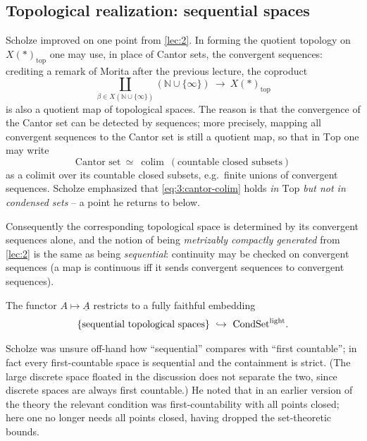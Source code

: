 \subsection{Topological realization: sequential spaces}

Scholze improved on one point from \cref{lec:2}. In forming the quotient
topology on $X(*)_{\mathrm{top}}$ one may use, in place of Cantor sets, the
convergent sequences: crediting a remark of Morita after the previous lecture,
the coproduct
\begin{equation*}
\coprod_{\beta\in X(\mathbb{N}\cup\{\infty\})}(\mathbb{N}\cup\{\infty\})
\ \longrightarrow\ X(*)_{\mathrm{top}}
\end{equation*}
is also a quotient map of topological spaces. The reason is that the convergence
of the Cantor set can be detected by sequences; more precisely, mapping all
convergent sequences to the Cantor set is still a quotient map, so that in
$\mathrm{Top}$ one may write
\begin{equation}
\label{eq:3:cantor-colim}
\text{Cantor set}\ \simeq\ \operatorname*{colim}\ (\text{countable closed subsets})
\end{equation}
as a colimit over its countable closed subsets, e.g.\ finite unions of convergent
sequences. Scholze emphasized that \eqref{eq:3:cantor-colim} holds \emph{in
$\mathrm{Top}$ but not in condensed sets} -- a point he returns to below.

Consequently the corresponding topological space is determined by its convergent
sequences alone, and the notion of being \emph{metrizably compactly generated}
from \cref{lec:2} is the same as being \emph{sequential}: continuity may be
checked on convergent sequences (a map is continuous iff it sends convergent
sequences to convergent sequences).

\begin{proposition}
\label{prop:3:sequential-embed}
The functor $A\mapsto\underline{A}$ restricts to a fully faithful embedding
\begin{equation*}
\{\text{sequential topological spaces}\}\ \hookrightarrow\ \CondSetl.
\end{equation*}
\end{proposition}

\begin{remark}
\label{rmk:3:sequential-first-countable}
Scholze was unsure off-hand how ``sequential'' compares with ``first
countable''; in fact every first-countable space is sequential and the
containment is strict. (The large discrete space floated in the discussion does
not separate the two, since discrete spaces are always first countable.) He
noted that in an earlier version of the theory the relevant condition was
first-countability with all points closed; here one no longer needs all points
closed, having dropped the set-theoretic bounds.
\end{remark}

